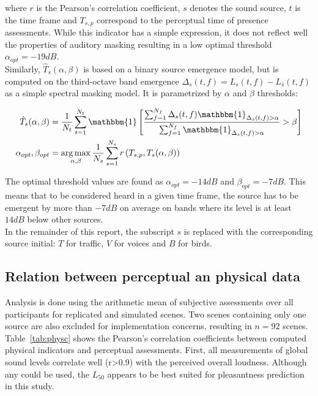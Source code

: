\documentclass[11pt,a4paper]{article}
\DeclareMathOperator*{\argmax}{arg\,max}
\begin{document}
where $r$ is the Pearson's correlation coefficient, $s$ denotes the sound source, $t$ is the time frame and $T_{s, p}$ correspond to the perceptual time of presence assessments. While this indicator has a simple expression, it does not reflect well the properties of auditory masking resulting in a low optimal threshold $\alpha_{opt} = -19dB$.\\

Similarly, $\hat T_s(\alpha, \beta)$ is based on a binary source emergence model, but is computed on the third-octave band emergence $\Delta_s(t, f) = L_s(t, f) - L_{\bar{s}}(t, f)$ as a simple spectral masking model. It is parametrized by $\alpha$ and $\beta$ thresholds:

\begin{align}
\hat T_s(\alpha, \beta) &= \frac{1}{N_t}\sum_{t = 1}^{N_t}\mathbbm{1}\left[ \frac{\sum_{f = 1}^{N_f}\Delta_s(t, f)\mathbbm{1}_{\Delta_s(t, f)>\alpha}}{\sum_{f = 1}^{N_f}\mathbbm{1}_{\Delta_s(t, f)>\alpha}}>\beta \right]\\
\alpha_{opt},\beta_{opt} &= \argmax_{\alpha, \beta}\frac{1}{N_s}\sum_{s = 1}^{N_s}r\left(T_{s, p}, T_s(\alpha, \beta)\right)
\end{align}

The optimal threshold values are found as $\alpha_{opt} = -14dB$ and $\beta_{opt} = -7dB$. This means that to be considered heard in a given time frame, the source has to be emergent by more than $-7dB$ on average on bands where its level is at least $14dB$ below other sources.\\

In the remainder of this report, the subscript $s$ is replaced with the corresponding source initial: $T$ for traffic, $V$ for voices and $B$ for birds.

\subsection{Relation between perceptual an physical data}
\label{sec:physm}

Analysis is done using the arithmetic mean of subjective assessments over all participants for replicated and simulated scenes. Two scenes containing only one source are also excluded for implementation concerns, resulting in $n=92$ scenes.\\

Table~\ref{tab:physc} shows the Pearson's correlation coefficients between computed physical indicators and perceptual assessments. First, all measurements of global sound levels correlate well (r>0.9) with the perceived overall loudness. Although any could be used, the $L_{50}$ appears to be best suited for pleasantness prediction in this study.\\
\end{document}
